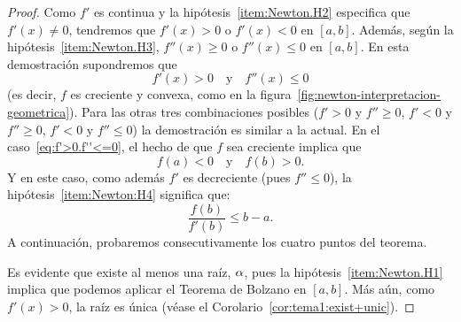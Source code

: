 \begin{proof}
  Como $f'$ es continua y la hipótesis~\ref{item:Newton.H2} especifica
  que $f'(x) \neq 0$, tendremos que $f'(x)>0$ o $f'(x)<0$ en $[a,b]$.
  Además, según la hipótesis~\ref{item:Newton.H3}, $f''(x)\ge 0$ o
  $f''(x)\le 0$ en $[a,b]$. En esta demostración supondremos que
  \begin{equation}
    f'(x)>0 \quad \text{y}\quad f''(x)\le 0
    \label{eq:f'>0.f''<=0}
  \end{equation}
  (es decir, $f$ es creciente y convexa, como en la
  figura~\ref{fig:newton-interpretacion-geometrica}). Para las otras
  tres combinaciones posibles ($f'>0$ y $f''\ge 0$, $f'<0$ y $f''\ge 0$,
  $f'<0$ y $f''\le 0$) la demostración es similar a la actual.  
  En el caso~\eqref{eq:f'>0.f''<=0}, el hecho de que $f$ sea creciente implica que
  \begin{equation*}
    f(a)<0 \quad\text{y}\quad f(b)>0.
  \end{equation*}
  Y en este caso, como además $f'$ es decreciente (pues $f''\le 0$), la
  hipótesis~\ref{item:Newton:H4} significa que:
  \begin{equation}
    \frac{f(b)}{f'(b)} \le b-a.
    \label{eq:Newton:H4.simplificada}
  \end{equation}
  A continuación, probaremos consecutivamente los cuatro puntos del
  teorema.

  Es evidente que existe al menos una raíz, $\alpha$, pues la
  hipótesis~\ref{item:Newton.H1} implica que podemos aplicar el
  Teorema de Bolzano en $[a,b]$. Más aún, como $f'(x)>0$, la raíz es única (véase el
  Corolario~\ref{cor:tema1:exist+unic}).


\end{proof}
